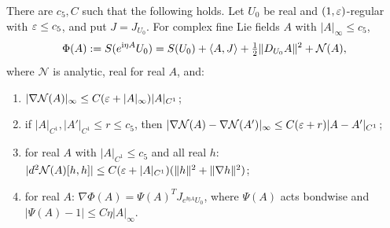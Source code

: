 \begin{proposition}\label{prop:action}
There are $c_5,C$ such that the following holds. Let $U_0$ be real and $(1,\varepsilon)$-regular with $\varepsilon\le c_5$, and put $J=J_{U_0}$. For complex fine Lie fields $A$ with $|A|_\infty\le c_5$,
\[
\Phi(A):=S(e^{\mathrm i\eta A}U_0)=S(U_0)+\langle A,J\rangle+\tfrac12\|D_{U_0}A\|^2+\mathcal N(A),
\]
where $\mathcal N$ is analytic, real for real $A$, and:
\begin{enumerate}[label=(\alph*)]
\item $|\nabla\mathcal N(A)|_\infty\le C(\varepsilon+|A|_\infty)|A|_{C^1}$;
\item if $|A|_{C^1},|A'|_{C^1}\le r\le c_5$, then $|\nabla\mathcal N(A)-\nabla\mathcal N(A')|_\infty\le C(\varepsilon+r)|A-A'|_{C^1}$;
\item for real $A$ with $|A|_{C^1}\le c_5$ and all real $h$: $|d^2\mathcal N(A)[h,h]|\le C(\varepsilon+|A|_{C^1})(\|h\|^2+\|\nabla h\|^2)$;
\item for real $A$: $\nabla\Phi(A)=\Psi(A)^TJ_{e^{\ii\eta A}U_0}$, where $\Psi(A)$ acts bondwise and $|\Psi(A)-1|\le C\eta|A|_\infty$.
\end{enumerate}
\end{proposition}

